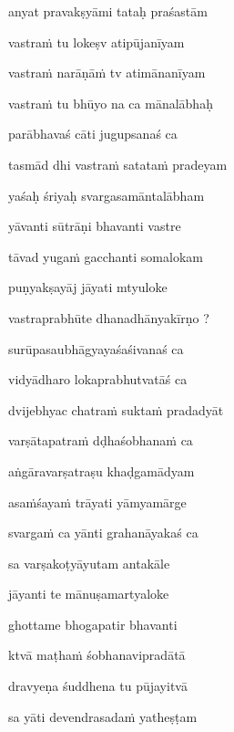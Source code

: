 \nemslokad 
anyat pravakṣyāmi tataḥ praśastām \veg\dontdisplaylinenum

\ujvers\nemsloka 
vastraṁ tu lokeṣv atipūjanīyam
\dontdisplaylinenum

\nemslokab 
vastraṁ narāṇāṁ tv atimānanīyam \danda\dontdisplaylinenum

\nemslokac 
vastraṁ tu bhūyo na ca mānalābhaḥ
\dontdisplaylinenum

\nemslokad 
parābhavaś cāti jugupsanaś ca \veg\dontdisplaylinenum

\ujvers\nemsloka 
tasmād dhi vastraṁ satataṁ pradeyam
\dontdisplaylinenum

\nemslokab 
yaśaḥ śriyaḥ svargasamāntalābham \danda\dontdisplaylinenum

\nemslokac 
yāvanti sūtrāṇi bhavanti vastre
\dontdisplaylinenum

\nemslokad 
tāvad yugaṁ gacchanti somalokam \veg\dontdisplaylinenum

\ujvers\nemsloka 
puṇyakṣayāj jāyati mtyuloke
\dontdisplaylinenum

\nemslokab 
vastraprabhūte dhanadhānyakīrṇo ? \danda\dontdisplaylinenum

\nemslokac 
surūpasaubhāgyayaśaśivanaś ca
\dontdisplaylinenum

\nemslokad 
vidyādharo lokaprabhutvatāś ca \veg\dontdisplaylinenum

\ujvers\nemsloka 
dvijebhyac chatraṁ suktaṁ pradadyāt
\dontdisplaylinenum

\nemslokab 
varṣātapatraṁ dḍhaśobhanaṁ ca \danda\dontdisplaylinenum

\nemslokac 
aṅgāravarṣatraṣu khaḍgamādyam
\dontdisplaylinenum

\nemslokad 
asaṁśayaṁ trāyati yāmyamārge \veg\dontdisplaylinenum

\ujvers\nemsloka 
svargaṁ ca yānti grahanāyakaś ca
\dontdisplaylinenum

\nemslokab 
sa varṣakoṭyāyutam antakāle \danda\dontdisplaylinenum

\nemslokac 
jāyanti te mānuṣamartyaloke
\dontdisplaylinenum

\nemslokad 
ghottame bhogapatir bhavanti \veg\dontdisplaylinenum

\ujvers\nemsloka 
ktvā maṭhaṁ śobhanavipradātā
\dontdisplaylinenum

\nemslokab 
dravyeṇa śuddhena tu pūjayitvā \danda\dontdisplaylinenum

\nemslokac 
sa yāti devendrasadaṁ yatheṣṭam
\dontdisplaylinenum

